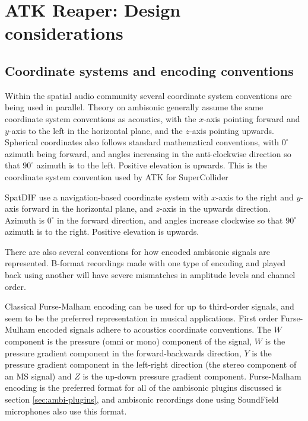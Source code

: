 \documentclass{article}
\begin{document}
\section{ATK Reaper: Design considerations}\label{sec:design}

\subsection{Coordinate systems and encoding conventions}\label{coordinate-systems}

Within the spatial audio community several coordinate system conventions are being used in parallel.
Theory on ambisonic generally assume the same coordinate system conventions as acoustics, with the $x$-axis pointing forward and $y$-axis to the left in the horizontal plane, and the $z$-axis pointing upwards. 
Spherical coordinates also follows standard mathematical conventions, with $0^{\circ}$ azimuth being forward, and angles increasing in the anti-clockwise direction so that $90^{\circ}$ azimuth is to the left.
Positive elevation is upwards.
This is the coordinate system convention used by ATK for SuperCollider

SpatDIF use a navigation-based coordinate system with $x$-axis to the right and $y$-axis forward in the horizontal plane, and $z$-axis in the upwards direction.
Azimuth is $0^{\circ}$ in the forward direction, and angles increase clockwise so that $90^{\circ}$ azimuth is to the right.
Positive elevation is upwards.

There are also several conventions for how encoded ambisonic signals are represented.
B-format recordings made with one type of encoding and played back using another will have severe mismatches in amplitude levels and channel order.

Classical Furse-Malham encoding can be used for up to third-order signals, and seem to be the preferred representation in musical applications.
First order Furse-Mulham encoded signals adhere to acoustics coordinate conventions.
The $W$ component is the pressure (omni or mono) component of the signal, $W$ is the pressure gradient component in the forward-backwards direction, $Y$ is the pressure gradient component in the left-right direction (the stereo component of an MS signal) and $Z$ is the up-down pressure gradient component.
Furse-Malham encoding is the preferred format for all of the ambisonic plugins discussed is section \ref{sec:ambi-plugins}, and ambisonic recordings done using SoundField microphones also use this format.
\end{document}
